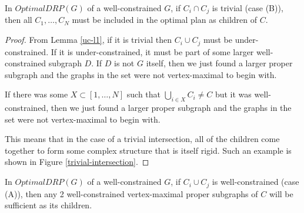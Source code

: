 \begin{theorem}\label{uc-t1}

In $OptimalDRP(G)$ of a well-constrained $G$, if $C_i \cap C_j$ is trivial (case (B)), then all $C_1,\ldots, C_N$ must be included in the optimal plan as children of $C$.
\end{theorem}

\begin{proof}
From Lemma \ref{uc-l1}, if it is trivial then $C_i \cup C_j$ must be under-constrained. If it is under-constrained, it must be part of some larger well-constrained subgraph $D$. If $D$ is not $G$ itself, then we just found a larger proper subgraph and the graphs in the set were not vertex-maximal to begin with.

If there was some $X\subset [1,\ldots,N]$ such that $\bigcup_{i\in X}{C_i}\neq C$ but it was well-constrained, then we just found a larger proper subgraph and the graphs in the set were not vertex-maximal to begin with.

This means that in the case of a trivial intersection, all of the children come together to form some complex structure that is itself rigid. Such an example is shown in Figure \ref{trivial-intersection}.
\end{proof}




\begin{theorem}\label{wc-t1}

In $OptimalDRP(G)$ of a well-constrained $G$, if $C_i \cup C_j$ is well-constrained (case (A)), then any 2 well-constrained vertex-maximal proper subgraphs of $C$ will be sufficient as its children.
\end{theorem}

